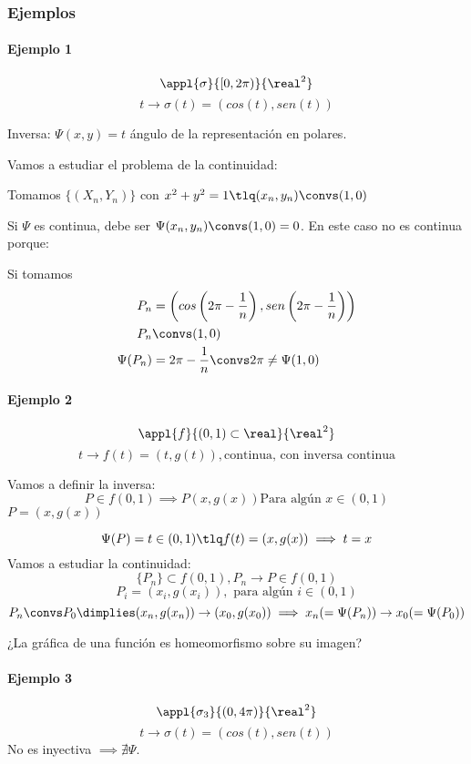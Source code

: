 \subsubsection{Ejemplos}


\paragraph{Ejemplo 1}

\[\appl{\sigma}{[0,2\pi)}{\real^2}\]
\[t \rightarrow \sigma(t) = (cos(t),sen(t))\]

Inversa: $\Psi(x,y) = t$ ángulo de la representación en polares.

Vamos a estudiar el problema de la continuidad:

Tomamos $\{(X_n,Y_n)\}$ con $x^2+y^2 = 1 \tlq (x_n,y_n) \convs (1,0)$

Si $\Psi$ es continua, debe ser $\Psi(x_n,y_n) \convs (1,0) = 0$. En este caso no es continua porque:

Si tomamos \begin{align*}
P_n &= \left(cos\left(2\pi - \frac{1}{n}\right), sen\left(2\pi - \frac{1}{n}\right) \right)\\
P_n &\convs (1,0)\\
\Psi(P_n) &= 2\pi - \frac{1}{n} \convs 2\pi\neq\Psi(1,0)
\end{align*}

\paragraph{Ejemplo 2}

\[\appl{f}{(0,1)\subset\real}{\real^2}\]
\[t \rightarrow f(t) = (t,g(t)), \text{continua, con inversa continua}\]

Vamos a definir la  inversa:
\[P\in f(0,1) \implies P(x,g(x)) \text{Para algún } x\in(0,1)\]
$P = (x,g(x))$

\[\Psi(P) = t \in (0,1) \tlq f(t) = (x,g(x)) \implies t = x\]
Vamos a estudiar la continuidad:
\[\{P_n\} \subset f(0,1), P_n \rightarrow P \in f(0,1)\]
\[P_i = (x_i,g(x_i)), \text{ para algún } i \in (0,1)\]
\[P_n \convs P_0 \dimplies (x_n,g(x_n)) \rightarrow (x_0,g(x_0)) \implies x_n (= \Psi(P_n)) \rightarrow x_0 (=\Psi(P_0)) \]

\obs ¿La gráfica de una función es homeomorfismo sobre su imagen?
\paragraph{Ejemplo 3}
\[\appl{\sigma_3}{(0,4\pi)}{\real^2}\]
\[t \rightarrow \sigma(t) = (cos(t),sen(t))\]
No es inyectiva $\implies \nexists \Psi$.

